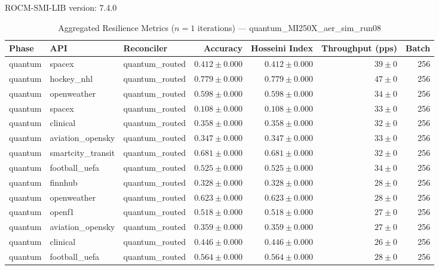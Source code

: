 ROCM-SMI-LIB version: 7.4.0

\begin{table}[htbp]
\caption{Aggregated Resilience Metrics ($n=1$ iterations) --- quantum_MI250X_aer_sim_run08}
\begin{tabular}{l l l r r r r}
\hline
Phase & API & Reconciler & Accuracy & Hosseini Index & Throughput (pps) & Batch \\
\hline
quantum & spacex & quantum\_routed & $0.412\pm0.000$ & $0.412\pm0.000$ & $39\pm0$ & 256 \\
quantum & hockey\_nhl & quantum\_routed & $0.779\pm0.000$ & $0.779\pm0.000$ & $47\pm0$ & 256 \\
quantum & openweather & quantum\_routed & $0.598\pm0.000$ & $0.598\pm0.000$ & $34\pm0$ & 256 \\
quantum & spacex & quantum\_routed & $0.108\pm0.000$ & $0.108\pm0.000$ & $33\pm0$ & 256 \\
quantum & clinical & quantum\_routed & $0.358\pm0.000$ & $0.358\pm0.000$ & $32\pm0$ & 256 \\
quantum & aviation\_opensky & quantum\_routed & $0.347\pm0.000$ & $0.347\pm0.000$ & $33\pm0$ & 256 \\
quantum & smartcity\_transit & quantum\_routed & $0.681\pm0.000$ & $0.681\pm0.000$ & $32\pm0$ & 256 \\
quantum & football\_uefa & quantum\_routed & $0.525\pm0.000$ & $0.525\pm0.000$ & $34\pm0$ & 256 \\
quantum & finnhub & quantum\_routed & $0.328\pm0.000$ & $0.328\pm0.000$ & $28\pm0$ & 256 \\
quantum & openweather & quantum\_routed & $0.623\pm0.000$ & $0.623\pm0.000$ & $28\pm0$ & 256 \\
quantum & openf1 & quantum\_routed & $0.518\pm0.000$ & $0.518\pm0.000$ & $27\pm0$ & 256 \\
quantum & aviation\_opensky & quantum\_routed & $0.359\pm0.000$ & $0.359\pm0.000$ & $27\pm0$ & 256 \\
quantum & clinical & quantum\_routed & $0.446\pm0.000$ & $0.446\pm0.000$ & $26\pm0$ & 256 \\
quantum & football\_uefa & quantum\_routed & $0.564\pm0.000$ & $0.564\pm0.000$ & $28\pm0$ & 256 \\

\end{tabular}
\end{table}
